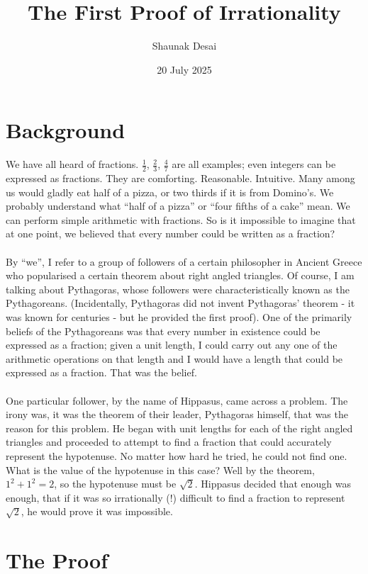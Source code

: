 \documentclass{article}
\title{The First Proof of Irrationality}
\author{Shaunak Desai}
\date{20 July 2025}
\begin{document}
\maketitle
\section*{Background}

We have all heard of fractions. $\frac{1}{2}$, $\frac{2}{3}$, $\frac{4}{7}$ are all examples; even integers can be expressed as fractions. They are comforting. Reasonable. Intuitive. Many among us would gladly eat half of a pizza, or two thirds if it is from Domino’s. We probably understand what “half of a pizza” or “four fifths of a cake” mean. We can perform simple arithmetic with fractions. So is it impossible to imagine that at one point, we believed that every number could be written as a fraction?
\\
\\
By “we”, I refer to a group of followers of a certain philosopher in Ancient Greece who popularised a certain theorem about right angled triangles. Of course, I am talking about Pythagoras, whose followers were characteristically known as the Pythagoreans. (Incidentally, Pythagoras did not invent Pythagoras’ theorem - it was known for centuries - but he provided the first proof). One of the primarily beliefs of the Pythagoreans was that every number in existence could be expressed as a fraction; given a unit length, I could carry out any one of the arithmetic operations on that length and I would have a length that could be expressed as a fraction. That was the belief.
\\
\\
One particular follower, by the name of Hippasus, came across a problem. The irony was, it was the theorem of their leader, Pythagoras himself, that was the reason for this problem. He began with unit lengths for each of the right angled triangles and proceeded to attempt to find a fraction that could accurately represent the hypotenuse. No matter how hard he tried, he could not find one. What is the value of the hypotenuse in this case? Well by the theorem, $1^2+1^2=2$, so the hypotenuse must be $\sqrt{2}$. Hippasus decided that enough was enough, that if it was so irrationally (!) difficult to find a fraction to represent $\sqrt{2}$, he would prove it was impossible.

\newpage
\section*{The Proof}
\end{document}
